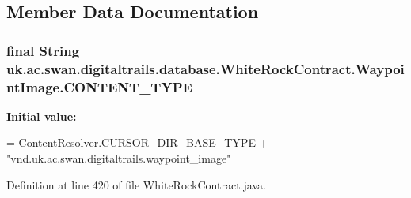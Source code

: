 \subsection{Member Data Documentation}
\hypertarget{classuk_1_1ac_1_1swan_1_1digitaltrails_1_1database_1_1_white_rock_contract_1_1_waypoint_image_a11c8f3afb103ca0123008a3cbf61e6a1}{
\subsubsection[{C\+O\+N\+T\+E\+N\+T\+\_\+\+T\+Y\+P\+E}]{\setlength{\rightskip}{0pt plus 5cm}final String uk.\+ac.\+swan.\+digitaltrails.\+database.\+White\+Rock\+Contract.\+Waypoint\+Image.\+C\+O\+N\+T\+E\+N\+T\+\_\+\+T\+Y\+P\+E\hspace{0.3cm}{\ttfamily [static]}}}\label{classuk_1_1ac_1_1swan_1_1digitaltrails_1_1database_1_1_white_rock_contract_1_1_waypoint_image_a11c8f3afb103ca0123008a3cbf61e6a1}
{\bfseries Initial value\+:}
\begin{DoxyCode}
= ContentResolver.CURSOR\_DIR\_BASE\_TYPE +
                \textcolor{stringliteral}{"vnd.uk.ac.swan.digitaltrails.waypoint\_image"}
\end{DoxyCode}


Definition at line 420 of file White\+Rock\+Contract.\+java.

